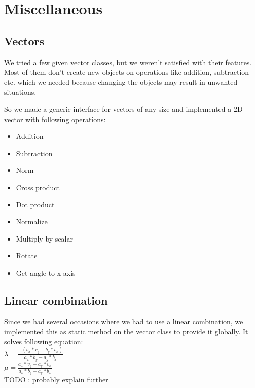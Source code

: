 
\section{Miscellaneous}

\subsection{Vectors}
\label{sec:vectors}

We tried a few given vector classes, but we weren't satisfied
with their features. Most of them don't create new objects
on operations like addition, subtraction etc. which we needed because 
changing the objects may result in unwanted situations. %

\noindent So we made a generic interface for vectors of any size and
implemented a 2D vector with following operations:

\begin{itemize}
\item Addition
\item Subtraction
\item Norm
\item Cross product
\item Dot product
\item Normalize
\item Multiply by scalar
\item Rotate 
\item Get angle to x axis
\end{itemize}

\subsection{Linear combination}
\label{sec:linearCombination}

Since we had several occasions where we had to use a
linear combination, we implemented this as static method
on the vector class to provide it globally. It solves following
equation: \\

$ \lambda = \frac{-(b_x*v_y - b_y * v_x)}{a_x * b_y - a_y * b_x}$\\

$\mu = \frac{a_x * v_y - a_y * v_x}{a_x * b_y - a_y * b_x} $ \\

TODO : probably explain further

